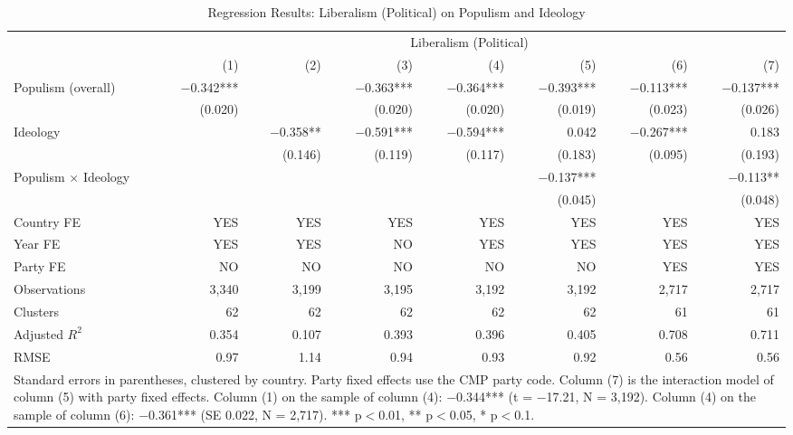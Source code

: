 \begin{table}
\caption{Regression Results: Liberalism (Political) on Populism and Ideology}
\label{tab:5}
\scriptsize\setlength{\tabcolsep}{4pt}
\centering
\begin{tabular}{lrrrrrrr}
\toprule
 & \multicolumn{7}{c}{Liberalism (Political)} \\
 & (1) & (2) & (3) & (4) & (5) & (6) & (7) \\
 \midrule
Populism (overall) & $-$0.342*** &  & $-$0.363*** & $-$0.364*** & $-$0.393*** & $-$0.113*** & $-$0.137*** \\
& (0.020) &  & (0.020) & (0.020) & (0.019) & (0.023) & (0.026) \\
Ideology &  & $-$0.358** & $-$0.591*** & $-$0.594*** & 0.042 & $-$0.267*** & 0.183 \\
&  & (0.146) & (0.119) & (0.117) & (0.183) & (0.095) & (0.193) \\
Populism $\times$ Ideology &  &  &  &  & $-$0.137*** &  & $-$0.113** \\
&  &  &  &  & (0.045) &  & (0.048) \\
\midrule
Country FE & YES & YES & YES & YES & YES & YES & YES\\
Year FE & YES & YES & NO & YES & YES & YES & YES\\
Party FE & NO & NO & NO & NO & NO & YES & YES\\
Observations & 3,340 & 3,199 & 3,195 & 3,192 & 3,192 & 2,717 & 2,717 \\
Clusters & 62 & 62 & 62 & 62 & 62 & 61 & 61 \\
Adjusted $R^2$ & 0.354 & 0.107 & 0.393 & 0.396 & 0.405 & 0.708 & 0.711 \\
RMSE & 0.97 & 1.14 & 0.94 & 0.93 & 0.92 & 0.56 & 0.56 \\
\bottomrule
\multicolumn{8}{p{0.9\linewidth}}{\scriptsize Standard errors in parentheses, clustered by country. Party fixed effects use the CMP party code. Column (7) is the interaction model of column (5) with party fixed effects. Column (1) on the sample of column (4): $-$0.344*** (t = $-$17.21, N = 3,192). Column (4) on the sample of column (6): $-$0.361*** (SE 0.022, N = 2,717). *** p$<$0.01, ** p$<$0.05, * p$<$0.1.} \\
\end{tabular}
\end{table}
